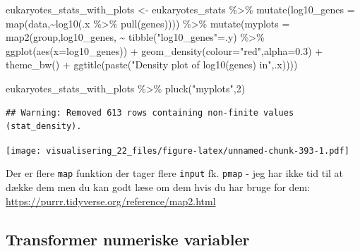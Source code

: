 \documentclass[
]{book}
\newenvironment{Shaded}{\begin{snugshade}}{\end{snugshade}}
\newcommand{\AttributeTok}[1]{\textcolor[rgb]{0.77,0.63,0.00}{#1}}
\newcommand{\DecValTok}[1]{\textcolor[rgb]{0.00,0.00,0.81}{#1}}
\newcommand{\FloatTok}[1]{\textcolor[rgb]{0.00,0.00,0.81}{#1}}
\newcommand{\FunctionTok}[1]{\textcolor[rgb]{0.00,0.00,0.00}{#1}}
\newcommand{\NormalTok}[1]{#1}
\newcommand{\OtherTok}[1]{\textcolor[rgb]{0.56,0.35,0.01}{#1}}
\newcommand{\SpecialCharTok}[1]{\textcolor[rgb]{0.00,0.00,0.00}{#1}}
\newcommand{\StringTok}[1]{\textcolor[rgb]{0.31,0.60,0.02}{#1}}
\begin{document}
\begin{Shaded}
\begin{Highlighting}[]
\NormalTok{eukaryotes\_stats\_with\_plots }\OtherTok{\textless{}{-}}\NormalTok{ eukaryotes\_stats }\SpecialCharTok{\%\textgreater{}\%} 
  \FunctionTok{mutate}\NormalTok{(}\AttributeTok{log10\_genes =} \FunctionTok{map}\NormalTok{(data,}\SpecialCharTok{\textasciitilde{}}\FunctionTok{log10}\NormalTok{(.x }\SpecialCharTok{\%\textgreater{}\%} \FunctionTok{pull}\NormalTok{(genes)))) }\SpecialCharTok{\%\textgreater{}\%} 
  \FunctionTok{mutate}\NormalTok{(}\AttributeTok{myplots =} \FunctionTok{map2}\NormalTok{(group,log10\_genes,}
                        \SpecialCharTok{\textasciitilde{}} \FunctionTok{tibble}\NormalTok{(}\StringTok{"log10\_genes"}\OtherTok{=}\NormalTok{.y) }\SpecialCharTok{\%\textgreater{}\%} 
                          \FunctionTok{ggplot}\NormalTok{(}\FunctionTok{aes}\NormalTok{(}\AttributeTok{x=}\NormalTok{log10\_genes)) }\SpecialCharTok{+}
                          \FunctionTok{geom\_density}\NormalTok{(}\AttributeTok{colour=}\StringTok{"red"}\NormalTok{,}\AttributeTok{alpha=}\FloatTok{0.3}\NormalTok{) }\SpecialCharTok{+} 
                          \FunctionTok{theme\_bw}\NormalTok{() }\SpecialCharTok{+} \FunctionTok{ggtitle}\NormalTok{(}\FunctionTok{paste}\NormalTok{(}\StringTok{"Density plot of log10(genes) in"}\NormalTok{,.x))))}
\end{Highlighting}
\end{Shaded}

\begin{Shaded}
\begin{Highlighting}[]
\NormalTok{eukaryotes\_stats\_with\_plots }\SpecialCharTok{\%\textgreater{}\%} \FunctionTok{pluck}\NormalTok{(}\StringTok{"myplots"}\NormalTok{,}\DecValTok{2}\NormalTok{)}
\end{Highlighting}
\end{Shaded}

\begin{verbatim}
## Warning: Removed 613 rows containing non-finite values (stat_density).
\end{verbatim}

\texttt{[image: visualisering\_22\_files/figure-latex/unnamed-chunk-393-1.pdf]}

Der er flere \texttt{map} funktion der tager flere \texttt{input} fk. \texttt{pmap} - jeg har ikke tid til at dække dem men du kan godt læse om dem hvis du har bruge for dem: \url{https://purrr.tidyverse.org/reference/map2.html}

\hypertarget{transformer-numeriske-variabler}{%
\subsection{Transformer numeriske variabler}\label{transformer-numeriske-variabler}}
\end{document}
